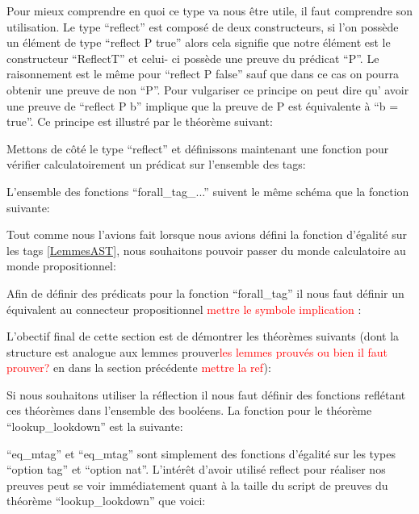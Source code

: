 \documentclass {article}
\newcommand{\codefrom}[3]
           {}
\theoremstyle{definition}
\theoremstyle{remark}
\newcommand{\todo}[1]{\textcolor{red}{#1}}
\begin{document}
Pour mieux comprendre en quoi ce type va nous être utile, il faut comprendre son utilisation.
Le type ``reflect'' est composé de deux constructeurs, si l'on possède un élément de type
``reflect P true'' alors cela signifie que notre élément est le constructeur ``ReflectT''
et celui- ci possède une preuve du prédicat ``P''. Le raisonnement est le même pour ``reflect P false''
sauf que dans ce cas on pourra obtenir une preuve de non ``P''. Pour vulgariser ce
principe on peut dire qu' avoir une preuve de ``reflect P b'' implique que la preuve
de P est équivalente à ``b = true''. Ce principe est illustré par le théorème suivant:

\codefrom{rapport}{definitions}{reflect_iff}


Mettons de côté le type ``reflect'' et définissons maintenant une fonction
pour vérifier calculatoirement un prédicat sur l'ensemble des tags:

\codefrom{src}{association_list}{forall_tag}

L'ensemble des fonctions ``forall\_tag\_...'' suivent le même schéma que la fonction suivante:

\codefrom{src}{association_list}{forall_tag_uno}

Tout comme nous l'avions fait lorsque nous avions défini la fonction d'égalité sur les tags \ref{LemmesAST},
nous souhaitons pouvoir passer du monde calculatoire au monde propositionnel:

\codefrom{src}{association_list}{helpBefore1}
\codefrom{src}{association_list}{helpBefore2}

Afin de définir des prédicats pour la fonction ``forall\_tag'' il nous faut définir un
équivalent au connecteur propositionnel \todo{mettre le symbole implication} :

\codefrom{src}{association_list}{imply}

L'obectif final de cette section est de démontrer les théorèmes suivants (dont la structure est analogue aux lemmes prouver\todo{les lemmes prouvés ou bien il faut prouver?}
en dans la section précédente \todo{mettre la ref}):

\codefrom{src}{association_list}{lookup_lookdown}
\codefrom{src}{association_list}{lookdown_lookup}


Si nous souhaitons utiliser la réflection il nous faut définir des fonctions reflétant
ces théorèmes dans l'ensemble des booléens. La fonction pour le théorème ``lookup\_lookdown''
est la suivante:

\codefrom{src}{association_list}{lookup_encdec}
``eq\_mtag'' et ``eq\_mtag'' sont simplement des fonctions d'égalité sur les types ``option tag'' et ``option nat''.
L'intérêt d'avoir utilisé reflect pour réaliser nos preuves peut se voir immédiatement quant à la taille
du script de preuves du théorème ``lookup\_lookdown'' que voici:
\end{document}
